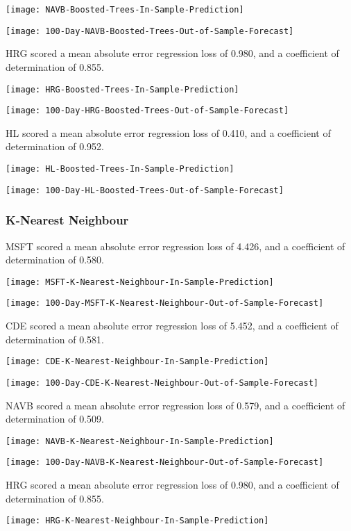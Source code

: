 \texttt{[image: NAVB-Boosted-Trees-In-Sample-Prediction]}

\texttt{[image: 100-Day-NAVB-Boosted-Trees-Out-of-Sample-Forecast]}

HRG scored a mean absolute error regression loss of 0.980, and a coefficient of determination of 0.855.

\texttt{[image: HRG-Boosted-Trees-In-Sample-Prediction]}

\texttt{[image: 100-Day-HRG-Boosted-Trees-Out-of-Sample-Forecast]}

HL scored a mean absolute error regression loss of 0.410, and a coefficient of determination of 0.952.

\texttt{[image: HL-Boosted-Trees-In-Sample-Prediction]}

\texttt{[image: 100-Day-HL-Boosted-Trees-Out-of-Sample-Forecast]}

\subsubsection{K-Nearest Neighbour}
MSFT scored a mean absolute error regression loss of 4.426, and a coefficient of determination of 0.580.

\texttt{[image: MSFT-K-Nearest-Neighbour-In-Sample-Prediction]}

\texttt{[image: 100-Day-MSFT-K-Nearest-Neighbour-Out-of-Sample-Forecast]}

CDE scored a mean absolute error regression loss of 5.452, and a coefficient of determination of 0.581.

\texttt{[image: CDE-K-Nearest-Neighbour-In-Sample-Prediction]}

\texttt{[image: 100-Day-CDE-K-Nearest-Neighbour-Out-of-Sample-Forecast]}

NAVB scored a mean absolute error regression loss of 0.579, and a coefficient of determination of 0.509.

\texttt{[image: NAVB-K-Nearest-Neighbour-In-Sample-Prediction]}

\texttt{[image: 100-Day-NAVB-K-Nearest-Neighbour-Out-of-Sample-Forecast]}

HRG scored a mean absolute error regression loss of 0.980, and a coefficient of determination of 0.855.

\texttt{[image: HRG-K-Nearest-Neighbour-In-Sample-Prediction]}

